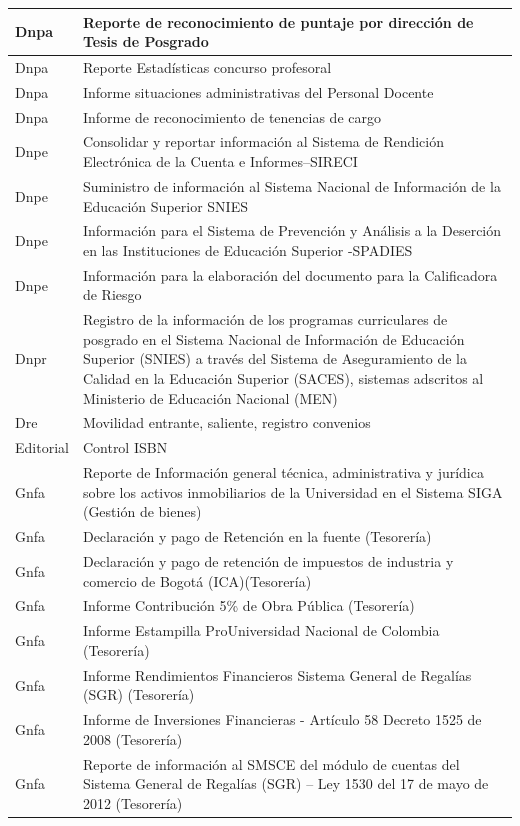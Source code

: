 \documentclass[
]{book}
\begin{document}
\begin{table}
\begin{tabular}[t]{l|l}
\hline
Dnpa & Reporte de reconocimiento de puntaje por dirección de Tesis de Posgrado\\
\hline
Dnpa & Reporte Estadísticas concurso profesoral\\
\hline
Dnpa & Informe situaciones administrativas del Personal Docente\\
\hline
Dnpa & Informe de reconocimiento de tenencias de cargo\\
\hline
Dnpe & Consolidar y reportar información al Sistema de Rendición Electrónica de la Cuenta e Informes–SIRECI\\
\hline
Dnpe & Suministro de información al Sistema Nacional de Información de la Educación Superior SNIES\\
\hline
Dnpe & Información para el Sistema de Prevención y Análisis a la Deserción en las Instituciones de Educación Superior -SPADIES\\
\hline
Dnpe & Información para la elaboración del documento para la Calificadora de Riesgo\\
\hline
Dnpr & Registro de la información de los programas curriculares de posgrado en el Sistema Nacional de Información de Educación Superior (SNIES) a través del Sistema de Aseguramiento de la Calidad en la Educación Superior (SACES), sistemas adscritos al Ministerio de Educación Nacional (MEN)\\
\hline
Dre & Movilidad entrante, saliente, registro convenios\\
\hline
Editorial & Control ISBN\\
\hline
Gnfa & Reporte de Información general técnica, administrativa y jurídica sobre los activos inmobiliarios de la Universidad en el Sistema SIGA (Gestión de bienes)\\
\hline
Gnfa & Declaración y pago de Retención en la fuente (Tesorería)\\
\hline
Gnfa & Declaración y pago de retención de impuestos de industria y comercio de Bogotá (ICA)(Tesorería)\\
\hline
Gnfa & Informe Contribución 5\% de Obra Pública (Tesorería)\\
\hline
Gnfa & Informe Estampilla ProUniversidad Nacional de Colombia (Tesorería)\\
\hline
Gnfa & Informe Rendimientos Financieros Sistema General de Regalías (SGR) (Tesorería)\\
\hline
Gnfa & Informe de Inversiones Financieras - Artículo 58 Decreto 1525 de 2008 (Tesorería)\\
\hline
Gnfa & Reporte de información al SMSCE del módulo de cuentas del Sistema General de Regalías (SGR) – Ley 1530 del 17 de mayo de 2012 (Tesorería)\\

\end{tabular}
\end{table}
\end{document}
